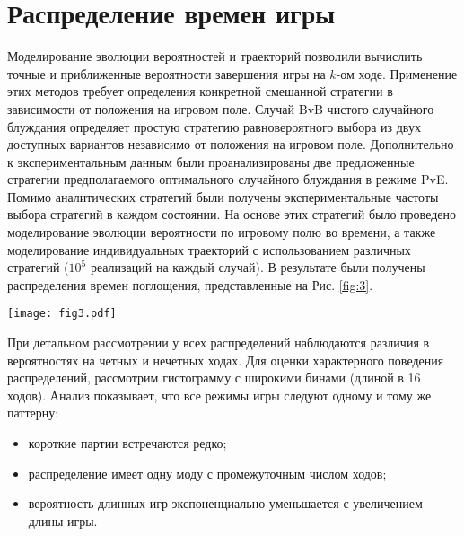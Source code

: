 \section{Распределение времен игры}\label{sec:ch3/sec3}

Моделирование эволюции вероятностей и траекторий позволили вычислить точные и приближенные вероятности завершения игры на $k$-ом ходе. 
Применение этих методов требует определения конкретной смешанной стратегии в зависимости от положения на игровом поле. 
Случай BvB чистого случайного блуждания определяет простую стратегию равновероятного выбора из двух доступных вариантов независимо от положения на игровом поле. 
Дополнительно к экспериментальным данным были проанализированы две предложенные стратегии предполагаемого оптимального случайного блуждания в режиме PvE. 
Помимо аналитических стратегий были получены экспериментальные частоты выбора стратегий в каждом состоянии. 
На основе этих стратегий было проведено моделирование эволюции вероятности по игровому полю во времени, 
а также моделирование индивидуальных траекторий с использованием различных стратегий ($10^5$ реализаций на каждый случай). 
В результате были получены распределения времен поглощения, представленные на Рис. \ref{fig:3}.

\begin{figure*}[t]
    \begin{center}
    \texttt{[image: fig3.pdf]}
    \caption{
        Распределение количества ходов, полученное моделированием (сплошная линия) и симуляцией (точки) с использованием соответствующих стратегий игроков A и B. 
        Режим BvB (красная линия) представляет собой равновероятный выбор для обоих игроков. Кривые PvE (зеленый и синий) и PvP-режим (фиолетовая линия) 
        были построены на основе соответствующих усредненных стратегий по популяции. Противоположная стратегия в режиме PvE – это стратегия равновероятного выбора. 
        Оптимальная стратегия для режима PvE в центре (зеленая пунктирная линия) – держать фишку на диагональной лестнице. Оптимальная стратегия для режима границы PvE 
        (синяя пунктирная линия) – выбирать движения только вдоль горизонтальной линии. Гистограммы, полученные экспериментально, представлены для режимов PvE 
        (зеленая и синяя области).
    }  
    \label{fig:3}
    \end{center}
\end{figure*}

При детальном рассмотрении у всех распределений наблюдаются различия в вероятностях на четных и нечетных ходах. 
Для оценки характерного поведения распределений, рассмотрим гистограмму с широкими бинами (длиной в 16 ходов). 
Анализ показывает, что все режимы игры следуют одному и тому же паттерну:
\begin{itemize}
\item короткие партии встречаются редко;
\item распределение имеет одну моду с промежуточным числом ходов;
\item вероятность длинных игр экспоненциально уменьшается с увеличением длины игры.
\end{itemize}

